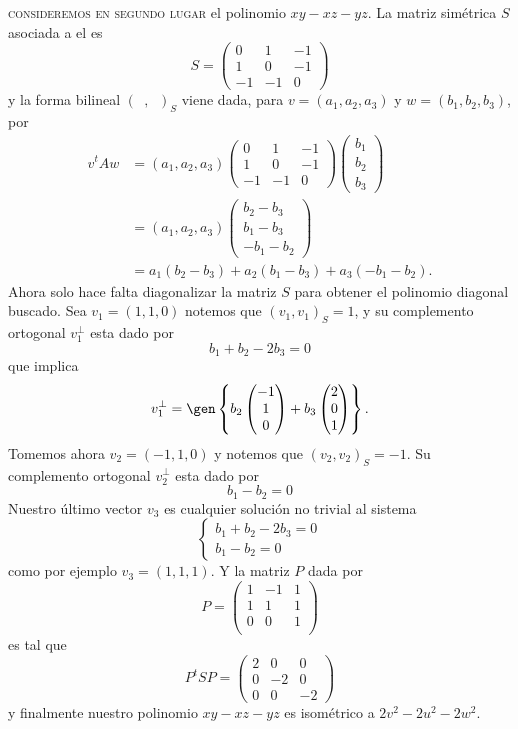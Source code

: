 \documentclass[twocolumn]{notasdeclase}
\newcommand{\Bform}{(\phantom{a},\phantom{a})}
\newcommand{\bform}[2]{(#1,#2)}
\begin{document}
\begin{sol}
\textsc{consideremos en segundo lugar} el polinomio $xy-xz-yz$. La matriz simétrica $S$ asociada a el es
\[ S = \begin{pmatrix}
0 & 1 & -1 \\
1 & 0 & -1 \\
-1 & -1 & 0
\end{pmatrix} \]
y la forma bilineal $\Bform_S$ viene dada,  para $v=(a_1,a_2,a_3)$ y $w=(b_1,b_2,b_3)$, por
\begin{align*}
v^tAw &= (a_1,a_2,a_3) \begin{pmatrix}
0 & 1 & -1 \\
1 & 0 & -1 \\
-1 & -1 & 0
\end{pmatrix} \begin{pmatrix}
b_1 \\ b_2 \\ b_3
\end{pmatrix} \\
&= (a_1,a_2,a_3) \begin{pmatrix}
b_2-b_3 \\
b_1-b_3 \\
-b_1-b_2
\end{pmatrix} \\
&= a_1(b_2-b_3) + a_2(b_1-b_3) + a_3(-b_1-b_2).
\end{align*}
Ahora solo hace falta diagonalizar la matriz $S$ para obtener el polinomio diagonal buscado. Sea $v_1 = (1,1,0)$ notemos que $\bform{v_1}{v_1}_S = 1$, y su complemento ortogonal $v_1^\perp$ esta dado por
\[ b_1+b_2-2b_3 = 0 \]
que implica
\[ v_1^\perp = \gen\left\{ b_2\begin{pmatrix}
-1 \\1 \\0 
\end{pmatrix}  + b_3\begin{pmatrix}
2 \\ 0 \\ 1
\end{pmatrix}\right\}. \]
Tomemos ahora $v_2 = (-1,1,0)$ y notemos que $\bform{v_2}{v_2}_S = -1$. Su complemento ortogonal $v_2^\perp$ esta dado por
\[ b_1-b_2 = 0 \]
Nuestro último vector $v_3$ es cualquier solución no trivial al sistema 
\[ \begin{cases}
b_1+b_2-2b_3 = 0 \\
b_1-b_2 = 0
\end{cases} \]
como por ejemplo $v_3=(1,1,1)$. Y la matriz $P$ dada por
\[ P = \begin{pmatrix}
1 & -1 & 1\\
1 & 1 & 1\\
0 & 0 & 1\\
\end{pmatrix} \]
es tal que
\[ P^tSP = \begin{pmatrix}
2 & 0 & 0 \\
0 & -2 & 0 \\
0 & 0 & -2
\end{pmatrix} \]
y finalmente nuestro polinomio $xy-xz-yz$ es isométrico a $2v^2-2u^2-2w^2$.


\end{sol}
\end{document}
